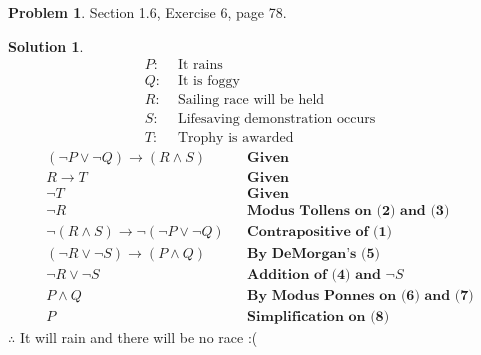 \documentclass{article}
\theoremstyle{definition}
\newtheorem{problem}{Problem}
\newtheorem*{solution}{Solution}
\begin{document}
\begin{problem} Section 1.6, Exercise 6, page 78. 
\end{problem}
\begin{solution}
\begin{align*}
  P:& \text{ It rains} \\
  Q:& \text{ It is foggy} \\
  R:& \text{ Sailing race will be held} \\
  S:& \text{ Lifesaving demonstration occurs} \\
  T:& \text{ Trophy is awarded}
\end{align*}
\setcounter{equation}{0}
\begin{align}
  (\neg P \lor \neg Q) \rightarrow (R \land S)& &\textbf{Given} \\
  R \rightarrow T& & \textbf{Given} \\
  \neg T& &\textbf{Given} \\
  \neg R& &\textbf{Modus Tollens on (2) and (3)} \\
  \neg(R \land S) \rightarrow \neg(\neg P \lor \neg Q)& &\textbf{Contrapositive of (1)} \\
  (\neg R \lor \neg S) \rightarrow (P \land Q)& &\textbf{By DeMorgan's (5)} \\
  \neg R \lor \neg S& &\textbf{Addition of (4) and }\neg S \\
  P \land Q& &\textbf{By Modus Ponnes on (6) and (7)} \\
  P& &\textbf{Simplification on (8)}
\end{align}
$\therefore$ It will rain and there will be no race :(
\end{solution}
\end{document}
